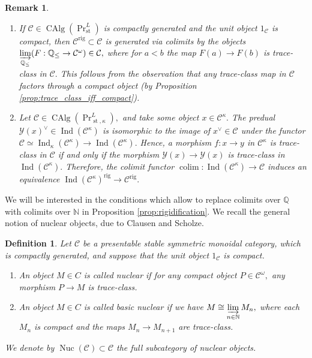 \documentclass[11pt,leqno]{amsart}
\newtheorem{defi}[theo]{Definition}
\newtheorem{remark}[theo]{Remark}
\numberwithin{equation}{section}
\def\N{\mathbb{N}}
\def\Q{\mathbb{Q}}
\DeclareMathOperator*{\colim}{colim}
\newcommand{\indlim}[1][]{\mathop{\varinjlim}\limits_{#1}}
\newcommand{\rig}{\operatorname{rig}}
\newcommand{\Nuc}{\operatorname{Nuc}}
\newcommand{\st}{\operatorname{st}}
\newcommand{\cC}{{\mathcal C}}
\newcommand{\cY}{{\mathcal Y}}
\newcommand{\CAlg}{\operatorname{CAlg}}
\newcommand{\Ind}{\operatorname{Ind}}
\begin{document}
\begin{remark}\label{rem:rigidification}
\begin{enumerate}[label=(\roman*), ref=(\roman*)]
\item If $\cC\in \CAlg(\Pr^L_{\st})$ is compactly generated and the unit object $1_{\cC}$ is compact, then $\cC^{\rig}\subset \cC$ is generated via colimits by the objects $\indlim[\Q_{\leq}](F:\Q_{\leq}\to\cC^{\omega})\in\cC,$ where for $a<b$ the map $F(a)\to F(b)$ is trace-class in $\cC.$ This follows from the observation that any trace-class map in $\cC$ factors through a compact object (by Proposition \ref{prop:trace_class_iff_compact}). \label{C^rig_for_comp_gen}
\item Let $\cC\in\CAlg(\Pr^L_{\st,\kappa}),$ and take some object $x\in\cC^{\kappa}.$ The predual $\cY(x)^{\vee}\in\Ind(\cC^{\kappa})$ is isomorphic to the image of $x^{\vee}\in\cC$ under the functor $\cC\simeq\Ind_{\kappa}(\cC^{\kappa})\to \Ind(\cC^{\kappa}).$ Hence, a morphism $f:x\to y$ in $\cC^{\kappa}$ is trace-class in $\cC$ if and only if the morphism $\cY(x)\to \cY(x)$ is trace-class in $\Ind(\cC^{\kappa}).$  Therefore, the colimit functor $\colim:\Ind(\cC^{\kappa})\to\cC$ induces an equivalence $\Ind(\cC^{\kappa})^{\rig}\to\cC^{\rig}.$ 
\end{enumerate}
\end{remark}

We will be interested in the conditions which allow to replace colimits over $\Q$ with colimits over $\N$ in Proposition \ref{prop:rigidification}. We recall the general notion of nuclear objects, due to Clausen and Scholze.

\begin{defi}\cite[Definitions 13.10 and 13.12]{CS20}\label{def:nuclear_objects} Let $\cC$ be a presentable stable symmetric monoidal category, which is compactly generated, and suppose that the unit object $1_{\cC}$ is compact.
\begin{enumerate}[label=(\roman*), ref=(\roman*)]
\item An object $M\in C$ is called nuclear if for any compact object $P\in\cC^{\omega},$ any morphism $P\to M$ is trace-class. 
\item An object $M\in C$ is called basic nuclear if we have $M\cong\indlim[n\in\N]M_n,$ where each $M_n$ is compact and the maps $M_n\to M_{n+1}$ are trace-class.
\end{enumerate}
We denote by $\Nuc(\cC)\subset\cC$ the full subcategory of nuclear objects. 
\end{defi}
\end{document}
